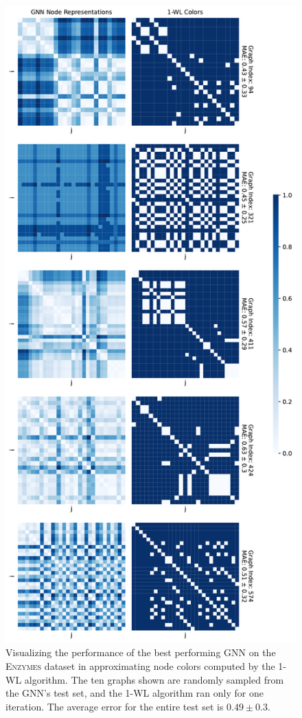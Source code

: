\begin{figure}[!ht]
\begin{minipage}[b]{0.45992852703\textwidth}
    \end{minipage}
    \hfill
    \begin{minipage}[b]{0.53007147296\textwidth}
        \includegraphics[width=\textwidth, right]{Figures/heatmaps_ENZYMES_1.pdf}
    \end{minipage}
    \hfill
    \caption{Visualizing the performance of the best performing GNN on the \textsc{Enzymes} dataset in approximating node colors computed by the 1-WL algorithm. The ten graphs shown are randomly sampled from the GNN's test set, and the 1-WL algorithm ran only for one iteration. The average error for the entire test set is $0.49 \pm 0.3$.}
\end{figure}

